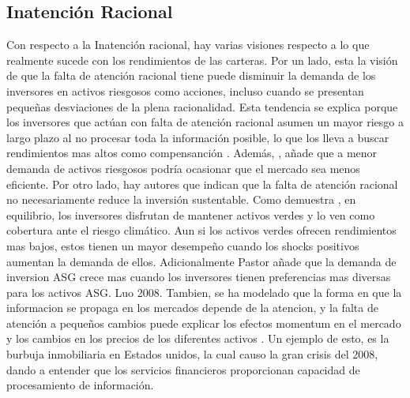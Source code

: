\subsection{Inatención Racional}

Con respecto a la Inatención racional, hay varias visiones respecto a lo que realmente sucede con los rendimientos de las carteras. Por un lado, esta la visión de que la falta de atención racional tiene puede disminuir la demanda de los inversores en activos riesgosos como acciones, incluso cuando se presentan pequeñas desviaciones de la plena racionalidad. Esta tendencia se explica porque los inversores que actúan con falta de atención racional asumen un mayor riesgo a largo plazo al no procesar toda la información posible, lo que los lleva a buscar rendimientos mas altos como compensanción \cite{luo_long-run_2016}. Además, \cite{miao_asset_2023}, añade que a menor demanda de activos riesgosos podría ocasionar que el mercado sea menos eficiente. Por otro lado, hay autores que indican que la falta de atención racional no necesariamente reduce la inversión sustentable. Como demuestra , en equilibrio, los inversores disfrutan de mantener activos verdes y lo ven como cobertura ante el riesgo climático. Aun si los activos verdes ofrecen rendimientos mas bajos, estos tienen un mayor desempeño cuando los shocks positivos aumentan la demanda de ellos. Adicionalmente Pastor añade que la demanda de inversion ASG crece mas cuando los inversores tienen preferencias mas diversas para los activos ASG. Luo 2008. Tambien, se ha modelado que la forma en que la informacion se propaga en los mercados depende de la atencion, y la falta de atención a pequeños cambios puede explicar los efectos momentum en el mercado y los cambios en los precios de los diferentes activos . Un ejemplo de esto, es la burbuja inmobiliaria en Estados unidos, la cual causo la gran crisis del 2008, dando a entender que los servicios financieros proporcionan capacidad de procesamiento de información. 

\vspace{0.5cm}

